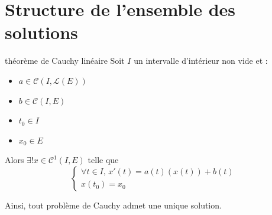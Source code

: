 \section{Structure de l'ensemble des solutions}

\begin{theoreme}{théorème de Cauchy linéaire}{}
    Soit $I$ un intervalle d'intérieur non vide et : 
    \begin{itemize}
        \item $a \in \mathscr C(I, \mathscr L(E))$
        \item $b \in \mathscr C(I, E)$
        \item $t_0 \in I$
        \item $x_0 \in E$
    \end{itemize}

    Alors $\exists ! x \in \mathscr C^1(I, E)$ telle que 
    $$\begin{cases}
        \forall t \in I, \, x'(t) = a(t)(x(t)) + b(t) \\
        x(t_0) = x_0
    \end{cases}$$

    Ainsi, tout problème de Cauchy admet une unique solution. 
\end{theoreme}


